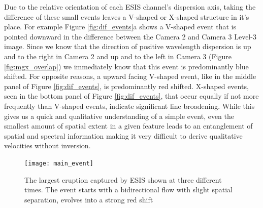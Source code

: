     	Due to the relative orientation of each ESIS channel's dispersion axis, taking the difference of these small events leaves a V-shaped or X-shaped structure in it's place.
    	For example Figure \ref{fig:dif_events}a shows a V-shaped event that is pointed downward in the difference between the Camera 2 and Camera 3 Level-3 image.
    	Since we know that the direction of positive wavelength dispersion is up and to the right in Camera 2 and up and to the left in Camera 3 (Figure \ref{fig:mgx_overlap}) we immediately know that this event is predominantly blue shifted.
    	For opposite reasons, a upward facing V-shaped event, like in the middle panel of Figure \ref{fig:dif_events}, is predominantly red shifted.
    	X-shaped events, seen in the bottom panel of Figure \ref{fig:dif_events}, that occur equally if not more frequently than V-shaped events, indicate significant line broadening.
    	While this gives us a quick and qualitative understanding of a simple event, even the smallest amount of spatial extent in a given feature leads to an entanglement of spatial and spectral information making it very difficult to derive qualitative velocities without inversion. 
    	
    	\begin{figure}[htb!]
    		\texttt{[image: main\_event]}
    		\centering
    		\caption{The largest eruption captured by ESIS shown at three different times. The event starts with a bidirectional flow with slight spatial separation, evolves into a strong red shift }
    		\label{fig:main_event}
    	\end{figure}
		
